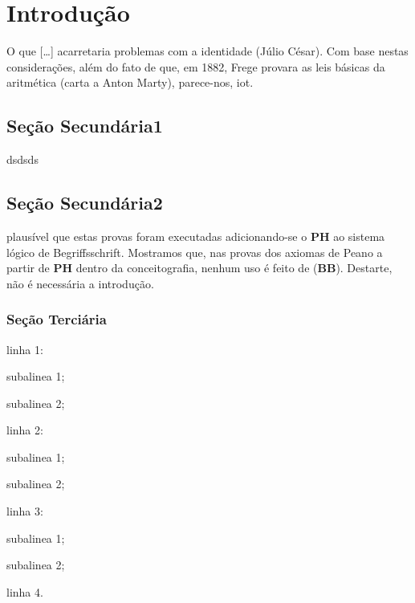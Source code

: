 \sffamily
\chapter{Introdução} 

O que [\ldots] acarretaria problemas com a identidade (Júlio César). Com base nestas considerações, além do fato de que, em 1882, Frege provara as leis básicas da aritmética (carta a Anton Marty), parece-nos, \ac{iot}.

\section{Seção Secundária1} 

dsdsds


\section[Seção Secundária2]{Seção Secundária2} 

plausível que estas provas foram executadas adicionando-se o \textbf{PH} ao sistema lógico de Begriffsschrift. Mostramos que, nas provas dos axiomas de Peano a partir de \textbf{PH} dentro da conceitografia, nenhum uso é feito de (\textbf{BB}). Destarte, não é necessária a introdução.

\subsection{Seção Terciária}

\begin{alineas}
	\item linha 1:
	\begin{alineas}
		\item subalinea 1;
		\item subalinea 2;
	\end{alineas}
	\item linha 2:
	\begin{subalineas}
		\item subalinea 1;
		\item subalinea 2;
	\end{subalineas}
	\item linha 3:
	\begin{incisos}
		\item subalinea 1;
		\item subalinea 2;
	\end{incisos}
	\item linha 4.
\end{alineas}


